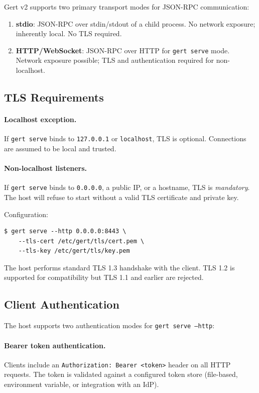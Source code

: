 Gert v2 supports two primary transport modes for JSON-RPC communication:

\begin{enumerate}
  \item \textbf{stdio}: JSON-RPC over stdin/stdout of a child process.  No
        network exposure; inherently local.  No TLS required.
  \item \textbf{HTTP/WebSocket}: JSON-RPC over HTTP for \texttt{gert serve}
        mode.  Network exposure possible; TLS and authentication required for
        non-localhost.
\end{enumerate}

\subsection{TLS Requirements}

\paragraph{Localhost exception.}
If \texttt{gert serve} binds to \texttt{127.0.0.1} or \texttt{localhost}, TLS
is optional.  Connections are assumed to be local and trusted.

\paragraph{Non-localhost listeners.}
If \texttt{gert serve} binds to \texttt{0.0.0.0}, a public IP, or a hostname,
TLS is \emph{mandatory}.  The host will refuse to start without a valid TLS
certificate and private key.

Configuration:

\begin{verbatim}
$ gert serve --http 0.0.0.0:8443 \
    --tls-cert /etc/gert/tls/cert.pem \
    --tls-key /etc/gert/tls/key.pem
\end{verbatim}

The host performs standard TLS 1.3 handshake with the client.  TLS 1.2 is
supported for compatibility but TLS 1.1 and earlier are rejected.

\subsection{Client Authentication}

The host supports two authentication modes for \texttt{gert serve --http}:

\paragraph{Bearer token authentication.}
Clients include an \texttt{Authorization: Bearer <token>} header on all HTTP
requests.  The token is validated against a configured token store
(file-based, environment variable, or integration with an IdP).


